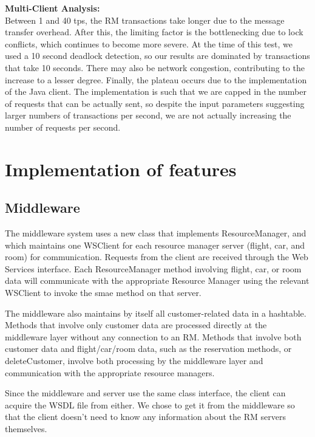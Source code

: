\documentclass[11pt]{article}
\begin{document}
\textbf{Multi-Client Analysis:}\\
Between 1 and 40 tps, the RM transactions take longer due to the message transfer overhead. After this, the limiting factor is the bottlenecking due to lock conflicts, which continues to become more severe. At the time of this test, we used a 10 second deadlock detection, so our results are dominated by transactions that take 10 seconds. There may also be network congestion, contributing to the increase to a lesser degree. Finally, the plateau occurs due to the implementation of the Java client. The implementation is such that we are capped in the number of requests that can be actually sent, so despite the input parameters suggesting larger numbers of transactions per second, we are not actually increasing the number of requests per second.

\section*{Implementation of features}

\subsection*{Middleware}

The middleware system uses a new class that implements ResourceManager, and which maintains one WSClient for each resource manager server (flight, car, and room) for communication. Requests from the client are received through the Web Services interface. Each ResourceManager method involving flight, car, or room data will communicate with the appropriate Resource Manager using the relevant WSClient to invoke the smae method on that server.  \par

The middleware also maintains by itself all customer-related data in a hashtable. Methods that involve only customer data are processed directly at the middleware layer without any connection to an RM. Methods that involve both customer data and flight/car/room data, such as the reservation methods, or deleteCustomer, involve both processing by the middleware layer and communication with the appropriate resource managers.  \par

Since the middleware and server use the same class interface, the client can acquire the WSDL file from either. We chose to get it from the middleware so that the client doesn't need to know any information about the RM servers themselves.  \par
\end{document}
